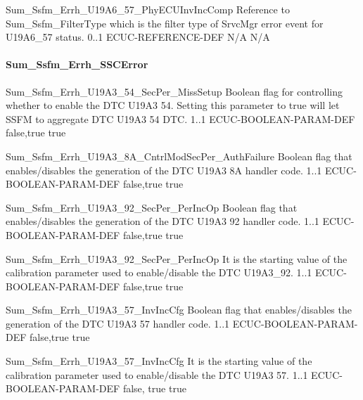 {Sum_Ssfm_Errh_U19A6_57_PhyECUInvIncComp}
{Reference to Sum_Ssfm_FilterType which is the filter type of SrvcMgr error event for U19A6_57 status.}
{0..1}
{ECUC-REFERENCE-DEF}
{N/A}
{N/A}

{} 

\paragraph{Sum_Ssfm_Errh_SSCError}

{Sum_Ssfm_Errh_U19A3_54_SecPer_MissSetup}
{Boolean flag for controlling whether to enable the DTC U19A3 54. Setting this parameter to true will let SSFM to aggregate DTC U19A3 54 DTC.}
{1..1}
{ECUC-BOOLEAN-PARAM-DEF}
{false,true}
{true}
 
{} 

{Sum_Ssfm_Errh_U19A3_8A_CntrlModSecPer_AuthFailure}
{Boolean flag that enables/disables the generation of the DTC U19A3 8A handler code.}
{1..1}
{ECUC-BOOLEAN-PARAM-DEF}
{false,true}
{true}

{ }

{Sum_Ssfm_Errh_U19A3_92_SecPer_PerIncOp}
{Boolean flag that enables/disables the generation of the DTC U19A3 92 handler code.}
{1..1}
{ECUC-BOOLEAN-PARAM-DEF}
{false,true}
{true}

{ }

{Sum_Ssfm_Errh_U19A3_92_SecPer_PerIncOp}
{It is the starting value of the calibration parameter used to enable/disable the DTC U19A3_92.}
{1..1}
{ECUC-BOOLEAN-PARAM-DEF}
{false,true}
{true}

{} 

{Sum_Ssfm_Errh_U19A3_57_InvIncCfg}
{Boolean flag that enables/disables the generation of the DTC U19A3 57 handler code.}
{1..1}
{ECUC-BOOLEAN-PARAM-DEF}
{false,true}
{true}

{ } 

{Sum_Ssfm_Errh_U19A3_57_InvIncCfg}
{It is the starting value of the calibration parameter used to enable/disable the DTC U19A3 57.}
{1..1}
{ECUC-BOOLEAN-PARAM-DEF}
{false, true}
{true}

